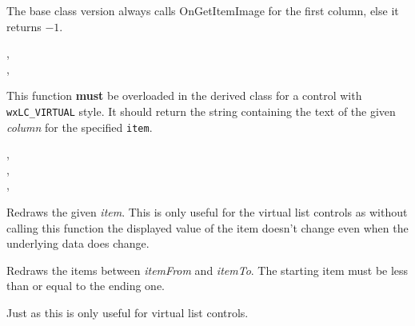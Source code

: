 The base class version always calls OnGetItemImage for the first column, else
it returns $-1$.


,\\
,\\

\label{wxlistctrlongetitemtext}


This function {\bf must} be overloaded in the derived class for a control with
{\tt wxLC\_VIRTUAL} style. It should return the string containing the text of
the given {\it column} for the specified {\tt item}.


,\\
,\\
,\\


\label{wxlistctrlrefreshitem}


Redraws the given {\it item}. This is only useful for the virtual list controls
as without calling this function the displayed value of the item doesn't change
even when the underlying data does change.





\label{wxlistctrlrefreshitems}


Redraws the items between {\it itemFrom} and {\it itemTo}. The starting item
must be less than or equal to the ending one.

Just as  this is only useful for
virtual list controls.



